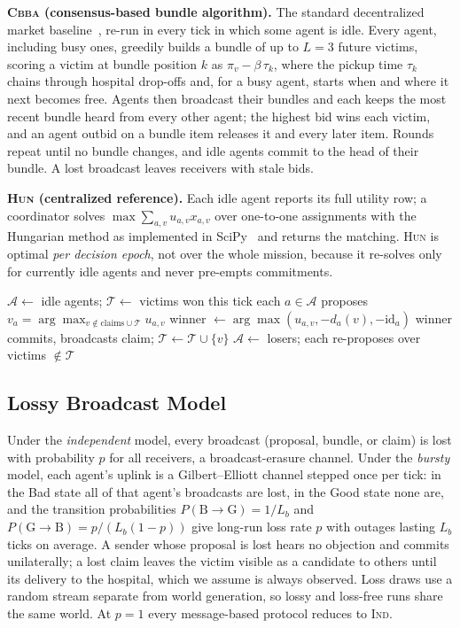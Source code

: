 \documentclass[conference]{IEEEtran}
\newcommand{\IND}{\textsc{Ind}}
\newcommand{\PRk}{\textsc{PR-k}}
\newcommand{\HUN}{\textsc{Hun}}
\newcommand{\CBBA}{\textsc{Cbba}}
\begin{document}
\textbf{\CBBA{} (consensus-based bundle algorithm).} The standard decentralized market baseline~\cite{buckman2019,quinton2023}, re-run in every tick in which some agent is idle. Every agent, including busy ones, greedily builds a bundle of up to $L=3$ future victims, scoring a victim at bundle position $k$ as $\pi_v - \beta\,\tau_k$, where the pickup time $\tau_k$ chains through hospital drop-offs and, for a busy agent, starts when and where it next becomes free. Agents then broadcast their bundles and each keeps the most recent bundle heard from every other agent; the highest bid wins each victim, and an agent outbid on a bundle item releases it and every later item. Rounds repeat until no bundle changes, and idle agents commit to the head of their bundle. A lost broadcast leaves receivers with stale bids.

\textbf{\HUN{} (centralized reference).} Each idle agent reports its full utility row; a coordinator solves $\max \sum_{a,v} u_{a,v}x_{a,v}$ over one-to-one assignments with the Hungarian method as implemented in SciPy~\cite{virtanen2020} and returns the matching. \HUN{} is optimal \emph{per decision epoch}, not over the whole mission, because it re-solves only for currently idle agents and never pre-empts commitments.

\begin{algorithm}[!t]
\caption{\PRk{}: one tick of iterative propose--resolve}
\label{alg:prk}
\small
\begin{algorithmic}[1]
\State $\mathcal{A} \gets$ idle agents; $\mathcal{T} \gets$ victims won this tick
\State each $a\in\mathcal{A}$ proposes $v_a=\arg\max_{v\notin \text{claims}\cup\mathcal{T}} u_{a,v}$
    \State winner $\gets \arg\max (u_{a,v}, -d_a(v), -\text{id}_a)$
    \State winner commits, broadcasts claim; $\mathcal{T}\gets\mathcal{T}\cup\{v\}$
  \EndFor
  \State $\mathcal{A}\gets$ losers; each re-proposes over victims $\notin\mathcal{T}$
\EndWhile
\end{algorithmic}
\end{algorithm}

\subsection{Lossy Broadcast Model}
Under the \emph{independent} model, every broadcast (proposal, bundle, or claim) is lost with probability $p$ for all receivers, a broadcast-erasure channel. Under the \emph{bursty} model, each agent's uplink is a Gilbert--Elliott channel stepped once per tick: in the Bad state all of that agent's broadcasts are lost, in the Good state none are, and the transition probabilities $P(\text{B}\!\to\!\text{G})=1/L_b$ and $P(\text{G}\!\to\!\text{B})=p/(L_b(1-p))$ give long-run loss rate $p$ with outages lasting $L_b$ ticks on average. A sender whose proposal is lost hears no objection and commits unilaterally; a lost claim leaves the victim visible as a candidate to others until its delivery to the hospital, which we assume is always observed. Loss draws use a random stream separate from world generation, so lossy and loss-free runs share the same world. At $p=1$ every message-based protocol reduces to \IND{}.
\end{document}
